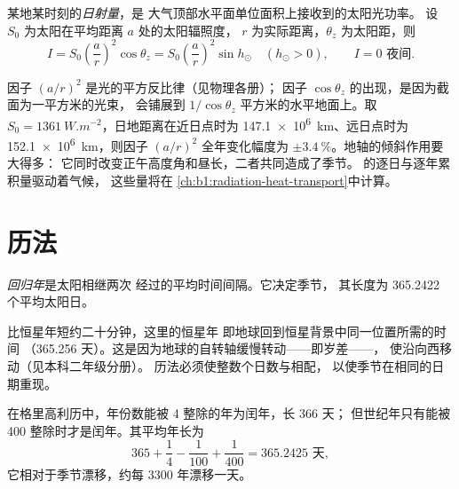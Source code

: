 \begin{definition}[日射量]\label{def:b1:spherical-astronomy:insolation}
某地某时刻的\emph{日射量}，是
大气顶部水平面单位面积上接收到的太阳光功率。
设 $S_0$ 为太阳在平均距离 $a$ 处的太阳辐照度，
$r$ 为实际距离，$\theta_z$ 为太阳距，则
\[
  I = S_0\left(\frac{a}{r}\right)^{2}\cos\theta_z = S_0\left(\frac{a}{r}\right)^{2}\sin h_\odot
  \quad (h_\odot > 0), \qquad I = 0 \text{ 夜间}.
\]
\end{definition}

因子 $(a/r)^2$ 是光的平方反比律（见物理各册）；
因子 $\cos\theta_z$ 的出现，是因为截面为一平方米的光束，
会铺展到 $1/\cos\theta_z$ 平方米的水平地面上。取
$S_0 = \qty{1361}{W.m^{-2}}$，日地距离在近日点时为
\qty{147.1e6}{km}、远日点时为\qty{152.1e6}{km}，则因子
$(a/r)^2$ 全年变化幅度为 $\pm\qty{3.4}{\percent}$。地轴的倾斜作用要大得多：
它同时改变正午高度角和昼长，二者共同造成了季节。
的逐日与逐年累积量驱动着气候，
这些量将在
\cref{ch:b1:radiation-heat-transport}中计算。


\section{历法}

\begin{definition}[回归年]\label{def:b1:spherical-astronomy:tropical-year}
\emph{回归年}是太阳相继两次
经过的平均时间间隔。它决定季节，
其长度为 365.2422 个平均太阳日。
\end{definition}

比恒星年短约二十分钟，这里的恒星年
即地球回到恒星背景中同一位置所需的时间
（365.256 天）。这是因为地球的自转轴缓慢转动——即岁差——，
使沿向西移动（见本科二年级分册）。
历法必须使整数个日数与相配，
以使季节在相同的日期重现。

\begin{proposition}[格里高利历的年长]\label{prop:b1:spherical-astronomy:gregorian}
在格里高利历中，年份数能被 4 整除的年为闰年，长 366 天；
但世纪年只有能被
400 整除时才是闰年。其平均年长为
\[
  365 + \frac14 - \frac1{100} + \frac1{400} = \num{365.2425}\text{ 天},
\]
它相对于季节漂移，约每 3300 年漂移一天。
\end{proposition}

